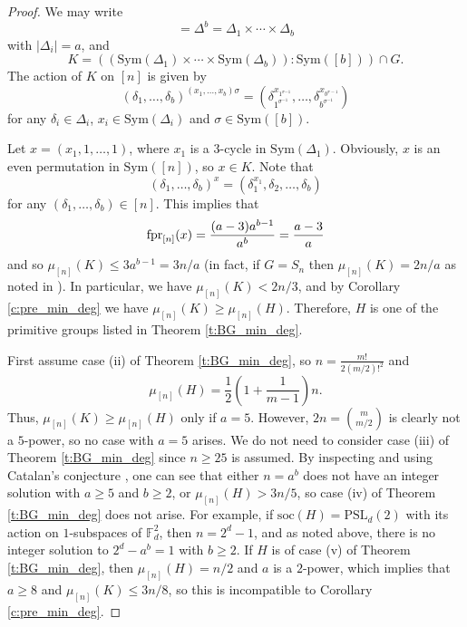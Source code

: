 \documentclass[twoside,a4paper,reqno,11pt]{amsart}
\newcommand{\<}{\langle}
\renewcommand{\>}{\rangle}
\newcommand{\leqs}{\leqslant}
\newcommand{\geqs}{\geqslant}
\newcommand{\fpr}{\mbox{{\rm fpr}}}
\newcommand{\soc}{\mathrm{soc}}
\newcommand{\PSL}{\mathrm{PSL}}
\theoremstyle{definition}
\begin{document}
	\begin{proof}
		We may write
		\begin{equation*}
		[n] = \Delta^b = \Delta_1\times\cdots\times \Delta_b
		\end{equation*}
		with $|\Delta_i| = a$, and
		\begin{equation*}
		K = ((\mathrm{Sym}(\Delta_1)\times\cdots\times\mathrm{Sym}(\Delta_b)){:}\mathrm{Sym}([b]))\cap G.
		\end{equation*}
		The action of $K$ on $[n]$ is given by
		\begin{equation}\label{e:prod}
		\left(\delta_1, \dots, \delta_b\right)^{\left(x_1, \dots, x_b\right) \sigma}=\left(\delta_{1^{\sigma^{-1}}}^{x_{1^{\sigma{-1}}}}, \dots, \delta_{b^{\sigma^{-1}}}^{x_{b^{\sigma-1}}}\right)
		\end{equation}
		for any $\delta_i\in\Delta_i$, $x_i\in \mathrm{Sym}(\Delta_i)$ and $\sigma\in \mathrm{Sym}([b])$.
		
		Let $x = (x_1,1,\dots,1)$, where $x_1$ is a $3$-cycle in $\mathrm{Sym}(\Delta_1)$. Obviously, $x$ is an even permutation in $\mathrm{Sym}([n])$, so $x\in K$. Note that
		\begin{equation*}
		\left(\delta_1, \dots, \delta_b\right)^x= (\delta_1^{x_1},\delta_2,\dots,\delta_b)
		\end{equation*}
		for any $(\delta_1,\dots,\delta_b)\in [n]$. This implies that
		\begin{equation*}
		\fpr_{[n]}(x) = \frac{(a-3)a^{b-1}}{a^b} = \frac{a-3}{a}
		\end{equation*}
		and so $\mu_{[n]}(K)\leqs 3a^{b-1} = 3n/a$ (in fact, if $G = S_n$ then $\mu_{[n]}(K) = 2n/a$ as noted in \cite[p. 130]{GM_min_deg}). In particular, we have $\mu_{[n]}(K) < 2n/3$, and by Corollary \ref{c:pre_min_deg} we have $\mu_{[n]}(K)\geqs \mu_{[n]}(H)$. Therefore, $H$ is one of the primitive groups listed in Theorem \ref{t:BG_min_deg}.
		
		First assume case (ii) of Theorem \ref{t:BG_min_deg}, so $n = \frac{m!}{2(m/2)!^2}$ and
		\begin{equation*}
		\mu_{[n]}(H) = \frac{1}{2}\left(1+\frac{1}{m-1}\right)n.
		\end{equation*}
		Thus, $\mu_{[n]}(K)\geqs\mu_{[n]}(H)$ only if $a = 5$. However, $2n = {m\choose m/2}$ is clearly not a $5$-power, so no case with $a = 5$ arises. We do not need to consider case (iii) of Theorem \ref{t:BG_min_deg} since $n\geqs 25$ is assumed. By inspecting \cite[Table 2]{BG_min_deg} and using Catalan's conjecture \cite{M_Catalan}, one can see that either $n = a^b$ does not have an integer solution with $a\geqs 5$ and $b\geqs 2$, or $\mu_{[n]}(H) > 3n/5$, so case (iv) of Theorem \ref{t:BG_min_deg} does not arise. For example, if $\soc(H) = \PSL_d(2)$ with its action on $1$-subspaces of $\mathbb{F}_d^2$, then $n = 2^d-1$, and as noted above, there is no integer solution to $2^d-a^b = 1$ with $b\geqs 2$. If $H$ is of case (v) of Theorem \ref{t:BG_min_deg}, then $\mu_{[n]}(H) = n/2$ and $a$ is a $2$-power, which implies that $a\geqs 8$ and $\mu_{[n]}(K)\leqs 3n/8$, so this is incompatible to Corollary \ref{c:pre_min_deg}.
		

\end{proof}
\end{document}
